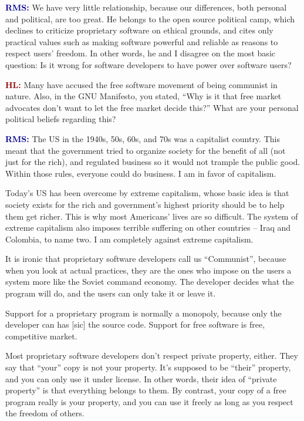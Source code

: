 \documentclass{article}
\newcommand{\hl}{\textcolor{DarkRed}{\textbf{HL: }}}
\newcommand{\rms}{\textcolor{DarkBlue}{\textbf{RMS: }}}
\begin{document}
\rms We have very little relationship, because our differences, both personal and political, are too great. He belongs to the open source political camp, which declines to criticize proprietary software on ethical grounds, and cites only practical values such as making software powerful and reliable as reasons to respect users' freedom. In other words, he and I disagree on the most basic question: Is it wrong for software developers to have power over software users?

\hl Many have accused the free software movement of being communist in nature. Also, in the GNU Manifesto, you stated, ``Why is it that free market advocates don't want to let the free market decide this?'' What are your personal political beliefs regarding this?

\rms The US in the 1940s, 50s, 60s, and 70s was a capitalist country. This meant that the government tried to organize society for the benefit of all (not just for the rich), and regulated business so it would not trample the public good. Within those rules, everyone could do business. I am in favor of capitalism.

Today's US has been overcome by extreme capitalism, whose basic idea is that society exists for the rich and government's highest priority should be to help them get richer. This is why most Americans' lives are so difficult. The system of extreme capitalism also imposes terrible suffering on other countries -- Iraq and Colombia, to name two. I am completely against extreme capitalism.

It is ironic that proprietary software developers call us ``Communist'', because when you look at actual practices, they are the ones who impose on the users a system more like the Soviet command economy. The developer decides what the program will do, and the users can only take it or leave it.

Support for a proprietary program is normally a monopoly, because only the developer can has [sic] the source code. Support for free software is free, competitive market.

Most proprietary software developers don't respect private property, either. They say that ``your'' copy is not your property. It's supposed to be ``their'' property, and you can only use it under license. In other words, their idea of ``private property'' is that everything belongs to them. By contrast, your copy of a free program really is your property, and you can use it freely as long as you respect the freedom of others.
\end{document}
